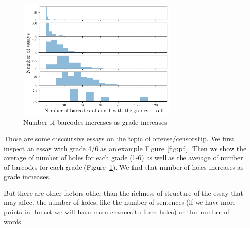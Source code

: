 \begin{figure}[H]
\includegraphics[width=8cm]{gradesh1.png}
\caption{Number of barcodes increases as grade increases}
\label{fig:ds}
\end{figure}

Those are some discoursive essays on the topic of offense/censorship. We first inspect
an essay with grade 4/6 as an example Figure~\ref{fig:pd}. Then we show
the average of number of holes for each grade (1-6)
as well as the average of number of barcodes for each grade (Figure~\ref{fig:ds}).
We find that number of holes increases as grade increases.

But there are other factors other than the richness of structure of the essay that may affect
the number of holes, like the number of sentences (if we have more points in the set
we will have more chances to form holes) or the number of words.

